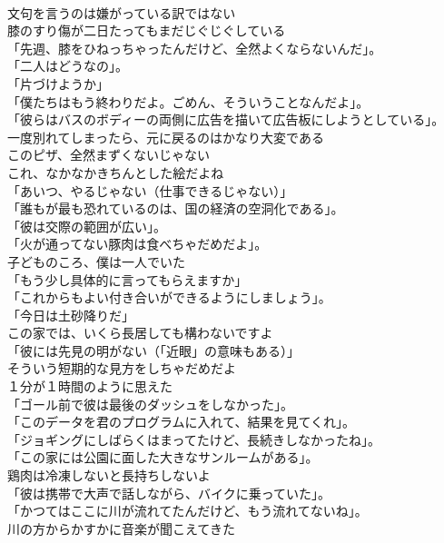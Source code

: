 \documentclass[8pt]{extreport}
\begin{document}
\begin{CJK}{UTF8}{min}
\\	文句を言うのは嫌がっている訳ではない	
\\	膝のすり傷が二日たってもまだじぐじぐしている	
\\	「先週、膝をひねっちゃったんだけど、全然よくならないんだ」。	
\\	「二人はどうなの」。	
\\	「片づけようか」	
\\	「僕たちはもう終わりだよ。ごめん、そういうことなんだよ」。	
\\	「彼らはバスのボディーの両側に広告を描いて広告板にしようとしている」。	
\\	一度別れてしまったら、元に戻るのはかなり大変である	
\\	このピザ、全然まずくないじゃない	
\\	これ、なかなかきちんとした絵だよね	
\\	「あいつ、やるじゃない（仕事できるじゃない）」	
\\	「誰もが最も恐れているのは、国の経済の空洞化である」。	
\\	「彼は交際の範囲が広い」。	
\\	「火が通ってない豚肉は食べちゃだめだよ」。	
\\	子どものころ、僕は一人でいた	
\\	「もう少し具体的に言ってもらえますか」	
\\	「これからもよい付き合いができるようにしましょう」。	
\\	「今日は土砂降りだ」	
\\	この家では、いくら長居しても構わないですよ	
\\	「彼には先見の明がない（「近眼」の意味もある）」	
\\	そういう短期的な見方をしちゃだめだよ	
\\	１分が１時間のように思えた	
\\	「ゴール前で彼は最後のダッシュをしなかった」。	
\\	「このデータを君のプログラムに入れて、結果を見てくれ」。	
\\	「ジョギングにしばらくはまってたけど、長続きしなかったね」。	
\\	「この家には公園に面した大きなサンルームがある」。	
\\	鶏肉は冷凍しないと長持ちしないよ	
\\	「彼は携帯で大声で話しながら、バイクに乗っていた」。	
\\	「かつてはここに川が流れてたんだけど、もう流れてないね」。	
\\	川の方からかすかに音楽が聞こえてきた	

\end{CJK}
\end{document}
